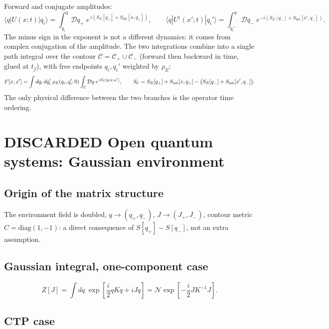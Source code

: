 \documentclass[12pt,a4paper,oneside]{article}
\numberwithin{equation}{section}   %
\begin{document}
Forward and conjugate amplitudes:
\[
\langle q|U(x;t)|q_i\rangle
=
\int_{q_i}^{q}\mathcal{D}q_+\;
e^{\,i\left(S_E[q_+] + S_{\mathrm{int}}[x,q_+]\right)},
\qquad
\langle q|U^\dagger(x';t)|q_i'\rangle
=
\int_{q_i'}^{q}\mathcal{D}q_-\;
e^{-i\left(S_E[q_-] + S_{\mathrm{int}}[x',q_-]\right)}.
\]
The minus sign in the exponent is not a different dynamics: it comes from complex conjugation of the amplitude. The two integrations combine into a single path integral over the contour $\mathcal C=\mathcal C_+\cup\mathcal C_-$ (forward then backward in time, glued at $t_f$), with free endpoints $q_i,q_i'$ weighted by $\rho_E$:
\begin{equation}
F[x,x']
=
\int dq_i\,dq_i'\;
\rho_E(q_i,q_i';0)
\int_{\mathcal{C}}\mathcal{D}q\;
e^{\,iS_{\mathcal{C}}[q;x,x']},
\qquad
S_{\mathcal{C}} = S_E[q_+]+S_{\rm int}[x,q_+] - \big(S_E[q_-]+S_{\rm int}[x',q_-]\big).
\end{equation}
The only physical difference between the two branches is the operator time ordering.

\section{DISCARDED Open quantum systems: Gaussian environment}

\subsection*{Origin of the matrix structure}

The environment field is doubled, $q\to(q_+,q_-)$, $J\to(J_+,J_-)$, contour metric $C=\mathrm{diag}(1,-1)$: a direct consequence of $S[q_+]-S[q_-]$, not an extra assumption.

\subsection*{Gaussian integral, one-component case}

\begin{equation}
Z[J] = \int dq\;\exp\!\left[\frac{i}{2}qKq + iJq\right]
= \mathcal N \exp\!\left[-\frac{i}{2}JK^{-1}J\right].
\end{equation}

\subsection*{CTP case}
\end{document}
